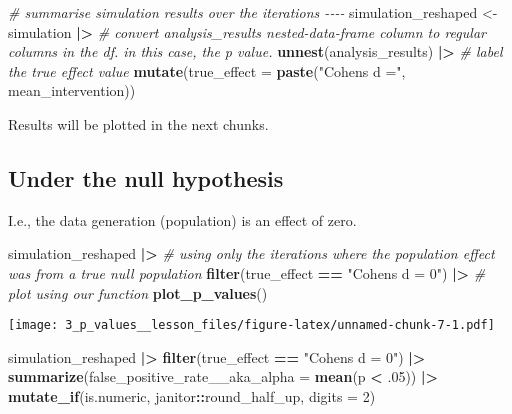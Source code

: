 \documentclass[
]{article}
\newenvironment{Shaded}{\begin{snugshade}}{\end{snugshade}}
\newcommand{\AttributeTok}[1]{\textcolor[rgb]{0.13,0.29,0.53}{#1}}
\newcommand{\CommentTok}[1]{\textcolor[rgb]{0.56,0.35,0.01}{\textit{#1}}}
\newcommand{\DecValTok}[1]{\textcolor[rgb]{0.00,0.00,0.81}{#1}}
\newcommand{\FunctionTok}[1]{\textcolor[rgb]{0.13,0.29,0.53}{\textbf{#1}}}
\newcommand{\NormalTok}[1]{#1}
\newcommand{\OtherTok}[1]{\textcolor[rgb]{0.56,0.35,0.01}{#1}}
\newcommand{\SpecialCharTok}[1]{\textcolor[rgb]{0.81,0.36,0.00}{\textbf{#1}}}
\newcommand{\StringTok}[1]{\textcolor[rgb]{0.31,0.60,0.02}{#1}}
\begin{document}
\begin{Shaded}
\begin{Highlighting}[]
\CommentTok{\# summarise simulation results over the iterations {-}{-}{-}{-}}
\NormalTok{simulation\_reshaped }\OtherTok{\textless{}{-}}\NormalTok{ simulation }\SpecialCharTok{|\textgreater{}}
  \CommentTok{\# convert \textasciigrave{}analysis\_results\textasciigrave{} nested{-}data{-}frame column to regular columns in the df. in this case, the p value.}
  \FunctionTok{unnest}\NormalTok{(analysis\_results) }\SpecialCharTok{|\textgreater{}}
  \CommentTok{\# label the true effect value}
  \FunctionTok{mutate}\NormalTok{(}\AttributeTok{true\_effect =} \FunctionTok{paste}\NormalTok{(}\StringTok{"Cohen\textquotesingle{}s d ="}\NormalTok{, mean\_intervention))}
\end{Highlighting}
\end{Shaded}

Results will be plotted in the next chunks.

\hypertarget{under-the-null-hypothesis}{%
\subsection{Under the null hypothesis}\label{under-the-null-hypothesis}}

I.e., the data generation (population) is an effect of zero.

\begin{Shaded}
\begin{Highlighting}[]
\NormalTok{simulation\_reshaped }\SpecialCharTok{|\textgreater{}}
  \CommentTok{\# using only the iterations where the population effect was from a true null population}
  \FunctionTok{filter}\NormalTok{(true\_effect }\SpecialCharTok{==} \StringTok{"Cohen\textquotesingle{}s d = 0"}\NormalTok{) }\SpecialCharTok{|\textgreater{}}
  \CommentTok{\# plot using our function}
  \FunctionTok{plot\_p\_values}\NormalTok{()}
\end{Highlighting}
\end{Shaded}

\texttt{[image: 3\_p\_values\_\_lesson\_files/figure-latex/unnamed-chunk-7-1.pdf]}

\begin{Shaded}
\begin{Highlighting}[]
\NormalTok{simulation\_reshaped }\SpecialCharTok{|\textgreater{}}
  \FunctionTok{filter}\NormalTok{(true\_effect }\SpecialCharTok{==} \StringTok{"Cohen\textquotesingle{}s d = 0"}\NormalTok{) }\SpecialCharTok{|\textgreater{}}
  \FunctionTok{summarize}\NormalTok{(}\AttributeTok{false\_positive\_rate\_\_aka\_alpha =} \FunctionTok{mean}\NormalTok{(p }\SpecialCharTok{\textless{}}\NormalTok{ .}\DecValTok{05}\NormalTok{)) }\SpecialCharTok{|\textgreater{}}
  \FunctionTok{mutate\_if}\NormalTok{(is.numeric, janitor}\SpecialCharTok{::}\NormalTok{round\_half\_up, }\AttributeTok{digits =} \DecValTok{2}\NormalTok{)}
\end{Highlighting}
\end{Shaded}
\end{document}
